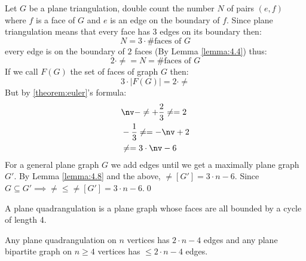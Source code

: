 \begin{prf}
    Let $G$ be a plane triangulation, double count the number $N$ of pairs $(e, f)$ where $f$ is a face of $G$ and $e$ is an edge on the boundary of $f$. Since plane triangulation means that every face has $3$ edges on its boundary then:
    \begin{equation*}
        N = 3 \cdot \text{\# faces of $G$}
    \end{equation*}
    every edge is on the boundary of $2$ faces (By Lemma \ref{lemma:4.4}) thus:
    \begin{equation*}
        2 \cdot \ne = N = \text{\# faces of $G$}
    \end{equation*}
    If we call $F(G)$ the set of faces of graph $G$ then:
    \begin{equation*}
        3 \cdot |F(G)| = 2 \cdot \ne
    \end{equation*}
    But by \ref{theorem:euler}'s formula:
    \begin{align*}
        &\nv - \ne + \frac{2}{3}\ne = 2 \\
        &- \frac{1}{3}\ne = -\nv + 2 \\
        &\ne = 3 \cdot \nv - 6
    \end{align*}
    For a general plane graph $G$ we add edges until we get a maximally plane graph $G'$. By Lemma \ref{lemma:4.8} and the above, $\ne[G'] = 3 \cdot n - 6$. Since $G \subseteq G' \implies \ne \leq \ne[G'] = 3 \cdot n - 6$.\qed
\end{prf}
\begin{definition}
    A plane quadrangulation is a plane graph whose faces are all bounded by a cycle of length 4.
\end{definition}
\begin{customcorollary}{4.10}
\label{corollary:4.10}
    Any plane quadrangulation on $n$ vertices has $2 \cdot n - 4$ edges and any plane bipartite graph on $n \geq 4$ vertices has $\leq 2 \cdot n - 4$ edges.
\end{customcorollary}
